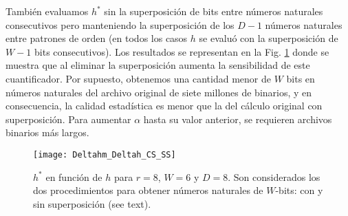 También evaluamos $h^*$ sin la superposición de bits entre números naturales consecutivos pero manteniendo la superposición de los $D-1$ números naturales entre patrones de orden (en todos los casos $h$ se evaluó con la superposición de $W-1$ bits consecutivos).
Los resultados se representan en la Fig. \ref{fig:Deltahm_Deltah_CS_SS} donde se muestra que al eliminar la superposición aumenta la sensibilidad de este cuantificador.
Por supuesto, obtenemos una cantidad menor de $W$ bits en números naturales del archivo original de siete millones de binarios, y en consecuencia, la calidad estadística es menor que la del cálculo original con superposición.
Para aumentar $\alpha$ hasta su valor anterior, se requieren archivos binarios más largos.
%
\begin{figure}
\centering
\texttt{[image: Deltahm\_Deltah\_CS\_SS]}
\caption{$h^*$ en función de $h$ para $r=8$, $W=6$ y $D=8$. Son considerados los dos procedimientos para obtener números naturales de $W$-bits: con y sin superposición (see text).}
\label{fig:Deltahm_Deltah_CS_SS}
\end{figure}